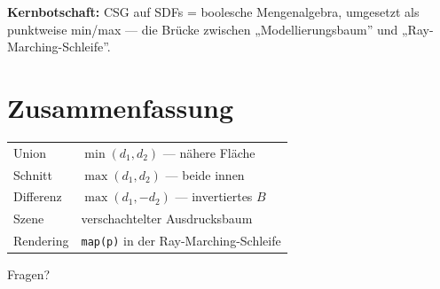 \documentclass[
  ngerman,
]{article}
\newcounter{none} %
\begin{document}
\vspace{0.5em}

\textbf{Kernbotschaft:} CSG auf SDFs = boolesche Mengenalgebra,
umgesetzt als punktweise min/max --- die Brücke zwischen
„Modellierungsbaum'' und „Ray-Marching-Schleife''.

\section{Zusammenfassung}\label{zusammenfassung}

{\def\LTcaptype{none} %
\begin{longtable}[]{@{}ll@{}}
\toprule\noalign{}
\endhead
\bottomrule\noalign{}
\endlastfoot
Union & \(\min(d_1, d_2)\) --- nähere Fläche \\
Schnitt & \(\max(d_1, d_2)\) --- beide innen \\
Differenz & \(\max(d_1, -d_2)\) --- invertiertes \(B\) \\
Szene & verschachtelter Ausdrucksbaum \\
Rendering & \texttt{map(p)} in der Ray-Marching-Schleife \\
\end{longtable}
}

\vspace{0.8em}

\centering

\large Fragen?
\end{document}
